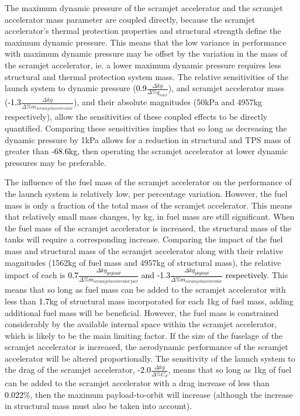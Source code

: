 The maximum dynamic pressure of the scramjet accelerator and the scramjet accelerator mass parameter are coupled directly, because the scramjet accelerator's thermal protection properties and structural strength define the maximum dynamic pressure. This means that the low variance in performance with maximum dynamic pressure may be offset by the variation in the mass of the scramjet accelerator, ie. a lower maximum dynamic pressure requires less structural and thermal protection system mass.
The relative sensitivities of the launch system to dynamic pressure (\textcolor{black}{0.9}$\frac{\Delta kg}{\Delta\%q_{max}}$), and scramjet accelerator mass (\textcolor{black}{-1.3}$\frac{\Delta kg}{\Delta\%m_{scramjet accelerator}}$), and their absolute magnitudes (50kPa and 4957kg respectively), allow the sensitivities of these coupled effects to be directly quantified. Comparing these sensitivities implies that so long as decreasing the dynamic pressure by 1kPa allows for a reduction in structural and TPS mass of greater than \textcolor{black}{-68.6kg}, then operating the scramjet accelerator at lower dynamic pressures may be preferable. 

The influence of the fuel mass of the scramjet accelerator on the performance of the launch system is relatively low, per percentage variation. However, the fuel mass is only a fraction of the total mass of the scramjet accelerator. This means that relatively small mass changes, by kg, in fuel mass are still significant. 
When the fuel mass of the scramjet accelerator is increased, the structural mass of the tanks will require a corresponding increase. 
Comparing the impact of the fuel mass and structural mass of the scramjet accelerator along with their relative magnitudes (1562kg of fuel mass and 4957kg of structural mass), the relative impact of each is \textcolor{black}{0.7$\frac{\Delta kg_{payload}}{\Delta\%m_{scramjet accelerator fuel}}$ and -1.3$\frac{\Delta kg_{payload}}{\Delta\%m_{scramjet accelerator}}$ respectively}. This means that so long as fuel mass can be added to the scramjet accelerator with less than \textcolor{black}{1.7}kg of structural mass incorporated for each 1kg of fuel mass, adding additional fuel mass will be beneficial. However, the fuel mass is constrained considerably by the available internal space within the scramjet accelerator, which is likely to be the main limiting factor.
If the size of the fuselage of the scramjet accelerator is increased, the aerodynamic performance of the scramjet accelerator will be altered proportionally. 
The sensitivity of the launch system to the drag of the scramjet accelerator, \textcolor{black}{-2.0}$\frac{\Delta kg}{\Delta\%C_{d}}$, means that so long as 1kg of fuel can be added to the scramjet accelerator with a drag increase of less than \textcolor{black}{0.022}\%, then the maximum payload-to-orbit will increase (although the increase in structural mass must also be taken into account). 


